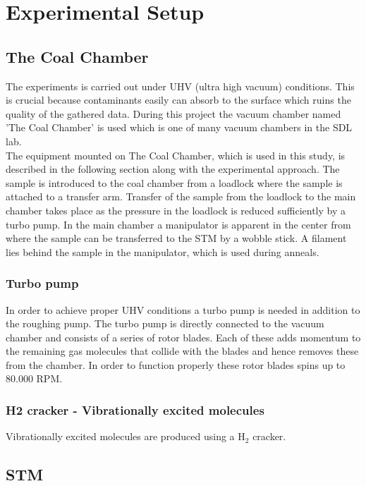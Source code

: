 \chapter{Experimental Setup}
\label{cha:procedure}

\section{The Coal Chamber}

  The experiments is carried out under UHV (ultra high vacuum) conditions. This is crucial because contaminants easily can absorb to the surface which ruins the quality of the gathered data. During this project the vacuum chamber named 'The Coal Chamber' is used which is one of many vacuum chambers in the SDL lab.\\
  The equipment mounted on The Coal Chamber, which is used in this study, is described in the following section along with the experimental approach. The sample is introduced to the coal chamber from a loadlock where the sample is attached to a transfer arm. Transfer of the sample from the loadlock to the main chamber takes place as the pressure in the loadlock is reduced sufficiently by a turbo pump. In the main chamber a manipulator is apparent in the center from where the sample can be transferred to the STM by a wobble stick. A filament lies behind the sample in the manipulator, which is used during anneals.

\subsection{Turbo pump}

  In order to achieve proper UHV conditions a turbo pump is needed in addition to the roughing pump. The turbo pump is directly connected to the vacuum chamber and consists of a series of rotor blades. Each of these adds momentum to the remaining gas molecules that collide with the blades and hence removes these from the chamber. In order to function properly these rotor blades spins up to 80.000 RPM.\cite{hofTurbo}

\subsection{H2 cracker - Vibrationally excited molecules}

Vibrationally excited molecules are produced using a H$_2$ cracker.

\section{STM}

